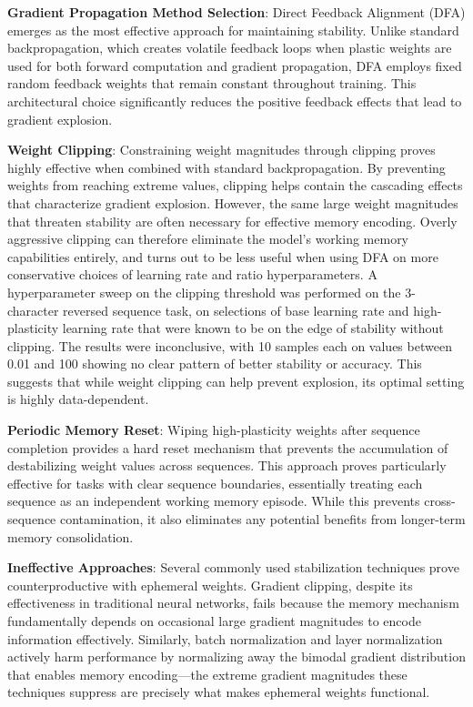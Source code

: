 \textbf{Gradient Propagation Method Selection}: Direct Feedback Alignment (DFA) emerges as the most effective approach for maintaining stability. Unlike standard backpropagation, which creates volatile feedback loops when plastic weights are used for both forward computation and gradient propagation, DFA employs fixed random feedback weights that remain constant throughout training. This architectural choice significantly reduces the positive feedback effects that lead to gradient explosion.

\textbf{Weight Clipping}: Constraining weight magnitudes through clipping proves highly effective when combined with standard backpropagation. By preventing weights from reaching extreme values, clipping helps contain the cascading effects that characterize gradient explosion. However, the same large weight magnitudes that threaten stability are often necessary for effective memory encoding. Overly aggressive clipping can therefore eliminate the model's working memory capabilities entirely, and turns out to be less useful when using DFA on more conservative choices of learning rate and ratio hyperparameters.
A hyperparameter sweep on the clipping threshold was performed on the 3-character reversed sequence task, on selections of base learning rate and high-plasticity learning rate that were known to be on the edge of stability without clipping. The results were inconclusive, with 10 samples each on values between 0.01 and 100 showing no clear pattern of better stability or accuracy. This suggests that while weight clipping can help prevent explosion, its optimal setting is highly data-dependent.

\textbf{Periodic Memory Reset}: Wiping high-plasticity weights after sequence completion provides a hard reset mechanism that prevents the accumulation of destabilizing weight values across sequences. This approach proves particularly effective for tasks with clear sequence boundaries, essentially treating each sequence as an independent working memory episode. While this prevents cross-sequence contamination, it also eliminates any potential benefits from longer-term memory consolidation.

\textbf{Ineffective Approaches}: Several commonly used stabilization techniques prove counterproductive with ephemeral weights. Gradient clipping, despite its effectiveness in traditional neural networks, fails because the memory mechanism fundamentally depends on occasional large gradient magnitudes to encode information effectively. Similarly, batch normalization and layer normalization actively harm performance by normalizing away the bimodal gradient distribution that enables memory encoding—the extreme gradient magnitudes these techniques suppress are precisely what makes ephemeral weights functional.

